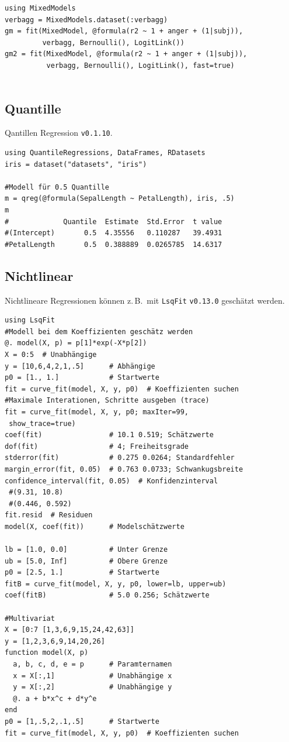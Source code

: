 \documentclass[10pt,twocolumn]{scrartcl}
\begin{document}
\begin{lstlisting}
using MixedModels
verbagg = MixedModels.dataset(:verbagg)
gm = fit(MixedModel, @formula(r2 ~ 1 + anger + (1|subj)),
         verbagg, Bernoulli(), LogitLink())
gm2 = fit(MixedModel, @formula(r2 ~ 1 + anger + (1|subj)),
          verbagg, Bernoulli(), LogitLink(), fast=true)


\end{lstlisting}

\subsection{Quantille}

Qantillen Regression \lstinline|v0.1.10|.

\begin{lstlisting}
using QuantileRegressions, DataFrames, RDatasets
iris = dataset("datasets", "iris")

#Modell für 0.5 Quantille
m = qreg(@formula(SepalLength ~ PetalLength), iris, .5)
m
#             Quantile  Estimate  Std.Error  t value
#(Intercept)       0.5  4.35556   0.110287   39.4931
#PetalLength       0.5  0.388889  0.0265785  14.6317
\end{lstlisting}

\subsection{Nichtlinear}

Nichtlineare Regressionen können z.\,B.\ mit \lstinline|LsqFit|
\lstinline|v0.13.0| geschätzt werden.

\begin{lstlisting}
using LsqFit
#Modell bei dem Koeffizienten geschätz werden
@. model(X, p) = p[1]*exp(-X*p[2])
X = 0:5  # Unabhängige
y = [10,6,4,2,1,.5]      # Abhängige
p0 = [1., 1.]            # Startwerte
fit = curve_fit(model, X, y, p0)  # Koeffizienten suchen
#Maximale Interationen, Schritte ausgeben (trace)
fit = curve_fit(model, X, y, p0; maxIter=99,
 show_trace=true)
coef(fit)                # 10.1 0.519; Schätzwerte
dof(fit)                 # 4; Freiheitsgrade
stderror(fit)            # 0.275 0.0264; Standardfehler
margin_error(fit, 0.05)  # 0.763 0.0733; Schwankugsbreite
confidence_interval(fit, 0.05)  # Konfidenzinterval
 #(9.31, 10.8)
 #(0.446, 0.592)
fit.resid  # Residuen
model(X, coef(fit))      # Modelschätzwerte

lb = [1.0, 0.0]          # Unter Grenze
ub = [5.0, Inf]          # Obere Grenze
p0 = [2.5, 1.]           # Startwerte
fitB = curve_fit(model, X, y, p0, lower=lb, upper=ub)
coef(fitB)               # 5.0 0.256; Schätzwerte

#Multivariat
X = [0:7 [1,3,6,9,15,24,42,63]]
y = [1,2,3,6,9,14,20,26]
function model(X, p)
  a, b, c, d, e = p      # Paramternamen
  x = X[:,1]             # Unabhängige x
  y = X[:,2]             # Unabhängige y
  @. a + b*x^c + d*y^e
end
p0 = [1,.5,2,.1,.5]      # Startwerte
fit = curve_fit(model, X, y, p0)  # Koeffizienten suchen
\end{lstlisting}
\end{document}
